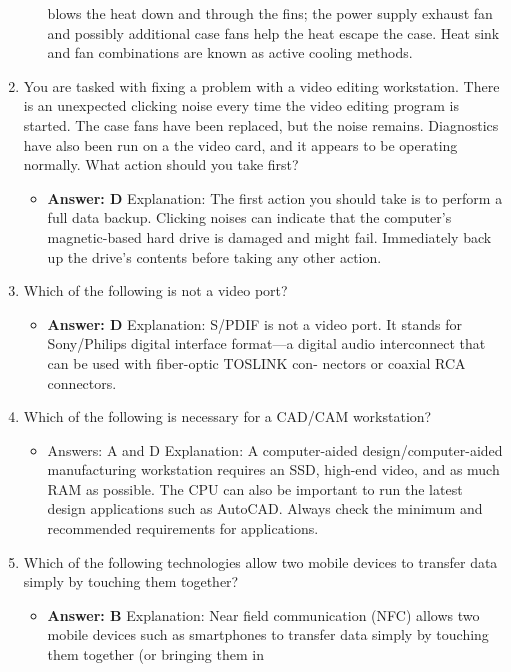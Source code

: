 \documentclass{article}
\begin{document}
\begin{enumerate}
\begin{itemize}
blows the heat down and through the fins; the power supply exhaust fan and possibly
additional case fans help the heat escape the case. Heat sink and fan combinations are
known as active cooling methods.
    \end{itemize}
    \item You are tasked with fixing a problem with a video editing workstation. There is an unexpected clicking noise 
    every time the video editing program is started. The case fans have been replaced, but the noise remains. Diagnostics
    have also been run on a the video card, and it appears to be operating normally. What action should you take first? 
    \begin{itemize}
        \item \textbf{ Answer: D}
Explanation: The first action you should take is to perform a full data backup. Clicking
noises can indicate that the computer’s magnetic-based hard drive is damaged and
might fail. Immediately back up the drive’s contents before taking any other action.
    \end{itemize}
    \item Which of the following is not a video port? 
    \begin{itemize}
        \item \textbf{ Answer: D}
Explanation: S/PDIF is not a video port. It stands for Sony/Philips digital interface
format—a digital audio interconnect that can be used with fiber-optic TOSLINK con-
nectors or coaxial RCA connectors.
    \end{itemize}
    \item Which of the following is necessary for a CAD/CAM workstation? 
    \begin{itemize}
        \item Answers: A and D
Explanation: A computer-aided design/computer-aided manufacturing workstation
requires an SSD, high-end video, and as much RAM as possible. The CPU can also
be important to run the latest design applications such as AutoCAD. Always check the
minimum and recommended requirements for applications.
    \end{itemize}
    \item Which of the following technologies allow two mobile devices to transfer data simply by touching them together? 
    \begin{itemize}
        \item \textbf{Answer: B}
Explanation: Near field communication (NFC) allows two mobile devices such as
smartphones to transfer data simply by touching them together (or bringing them in

\end{itemize}
\end{enumerate}
\end{document}
